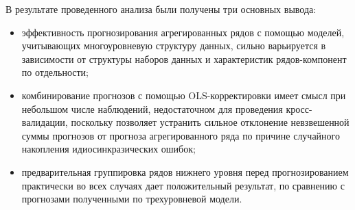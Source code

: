 \documentclass[12pt,a4paper, oneside]{extreport}
\begin{document}
В результате проведенного анализа были получены три основных вывода: 

\begin{itemize}
	\item эффективность   прогнозирования  агрегированных рядов с помощью моделей, учитывающих многоуровневую структуру данных,  сильно варьируется в зависимости от структуры наборов данных и характеристик рядов-компонент   по отдельности;
	\item комбинирование прогнозов с помощью OLS-корректировки  имеет смысл при небольшом числе наблюдений, недостаточном для проведения кросс-валидации, поскольку позволяет устранить сильное отклонение невзвешенной суммы прогнозов от прогноза агрегированного ряда по причине случайного накопления идиосинкразических ошибок;
	\item     предварительная группировка рядов нижнего уровня перед прогнозированием практически во всех случаях дает положительный результат, по сравнению с прогнозами полученными по трехуровневой модели. 
\end{itemize}


















\newpage

\nocite{*}  %
\end{document}
